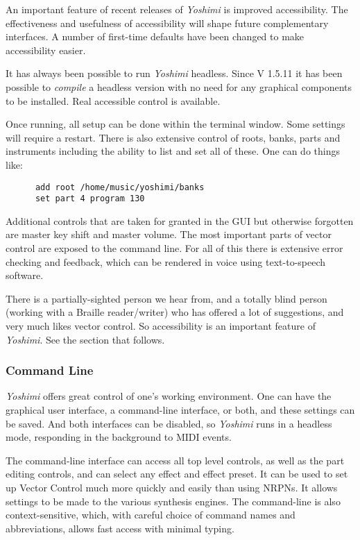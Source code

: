 \documentclass[
 11pt,
 twoside,
 a4paper,
 final                                 %
]{article}
\begin{document}
   An important feature of recent releases of \textsl{Yoshimi} is improved
   accessibility. The effectiveness and usefulness of accessibility will
   shape future complementary interfaces. A number of first-time defaults
   have been changed to make accessibility easier.

   It has always been possible to run \textsl{Yoshimi} headless. Since V
   1.5.11 it has been possible to \textsl{compile} a headless version with
   no need for any graphical components to be installed. Real accessible
   control is available.

   Once running, all setup can be done within the terminal window.
   Some settings will require a restart.
   There is also extensive control of roots, banks, parts and instruments
   including the ability to list and set all of these. One can do things like:

   \begin{verbatim}
      add root /home/music/yoshimi/banks
      set part 4 program 130
   \end{verbatim}

   Additional controls that are taken for granted in the GUI but otherwise
   forgotten are master key shift and master volume.  The most important parts
   of vector control are exposed to the command line.
   For all of this there is extensive error checking and feedback, which can be
   rendered in voice using text-to-speech software.

   There is a partially-sighted person we hear from, and a totally blind person
   (working with a Braille reader/writer) who has offered a lot of suggestions,
   and very much likes vector control.  So accessibility 
   is an important feature of \textsl{Yoshimi}.  See the section that follows.

\subsubsection{Command Line}
\label{subsubsec:new_features_command_line}

   \textsl{Yoshimi} offers great control of one's working environment.
   One can have the graphical user interface, a command-line
   interface, or both, and these settings can be saved.  And both
   interfaces can be disabled, so \textsl{Yoshimi} runs in a headless
   mode, responding in the background to MIDI events.

   The command-line interface can access all top level controls, as well as the
   part editing controls, and can select any effect and effect preset.  It can be
   used to set up Vector Control much more quickly and easily than using NRPNs.
   It allows settings to be made to the various synthesis engines.
   The command-line is also context-sensitive, which, with careful choice
   of command names and abbreviations, allows fast access with minimal
   typing.
\end{document}

